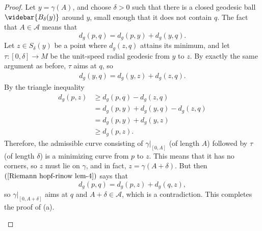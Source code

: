 \begin{proof}
Let $y=\gamma(A)$, and choose $\delta>0$ such that there is a closed geodesic ball $\widebar{B_{\delta}(y)}$ around $y$, small enough that it does not contain $q$. The fact that $A\in\mathcal{A}$ means that
\[d_g(p,q)=d_g(p,y)+d_g(y,q).\]
Let $z\in S_\delta(y)$ be a point where $d_g(z,q)$ attains its minimum, and let $\tau:[0,\delta]\to M$ be the unit-speed radial geodesic from $y$ to $z$. By exactly the same argument as before, $\tau$ aims at $q$, so
\begin{align}\label{Riemann hopf-rinow lem-3}
d_g(y,q)=d_g(y,z)+d_g(z,q).
\end{align}
By the triangle inequality
\begin{equation}\label{Riemann hopf-rinow lem-4}
\begin{aligned}
d_g(p,z)&\geq d_g(p,q)-d_g(z,q)\\
&=d_g(p,y)+d_g(y,q)-d_g(z,q)\\
&=d_g(p,y)+d_g(y,z)\\
&\geq d_g(p,z).
\end{aligned}
\end{equation}
Therefore, the admissible curve consisting of $\gamma|_{[0,A]}$ (of length $A$) followed by $\tau$ (of length $\delta$) is a minimizing curve from $p$ to $z$. This means that it has no corners, so $z$ must lie on $\gamma$, and in fact, $z=\gamma(A+\delta)$. But then $(\ref{Riemann hopf-rinow lem-4})$ says that
\[d_g(p,q)=d_g(p,z)+d_g(q,z),\]
so $\gamma|_{[0,A+\delta]}$ aims at $q$ and $A+\delta\in\mathcal{A}$, which is a contradiction. This completes the proof of (a).
\begin{figure}[htbp]
\centering

\end{figure}
\end{proof}
